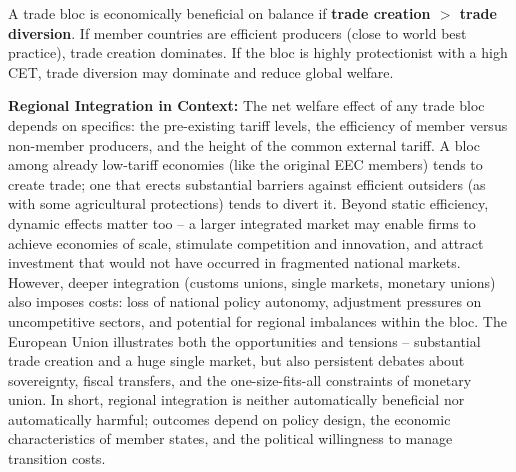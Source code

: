 \documentclass[11pt, a4paper, twoside]{book}
\begin{document}
\begin{coreidea}
A trade bloc is economically beneficial on balance if \textbf{trade creation $>$ trade diversion}. If member countries are efficient producers (close to world best practice), trade creation dominates. If the bloc is highly protectionist with a high CET, trade diversion may dominate and reduce global welfare.
\end{coreidea}

\textbf{Regional Integration in Context:} The net welfare effect of any trade bloc depends on specifics: the pre-existing tariff levels, the efficiency of member versus non-member producers, and the height of the common external tariff. A bloc among already low-tariff economies (like the original EEC members) tends to create trade; one that erects substantial barriers against efficient outsiders (as with some agricultural protections) tends to divert it. Beyond static efficiency, dynamic effects matter too -- a larger integrated market may enable firms to achieve economies of scale, stimulate competition and innovation, and attract investment that would not have occurred in fragmented national markets. However, deeper integration (customs unions, single markets, monetary unions) also imposes costs: loss of national policy autonomy, adjustment pressures on uncompetitive sectors, and potential for regional imbalances within the bloc. The European Union illustrates both the opportunities and tensions -- substantial trade creation and a huge single market, but also persistent debates about sovereignty, fiscal transfers, and the one-size-fits-all constraints of monetary union. In short, regional integration is neither automatically beneficial nor automatically harmful; outcomes depend on policy design, the economic characteristics of member states, and the political willingness to manage transition costs.
\end{document}
